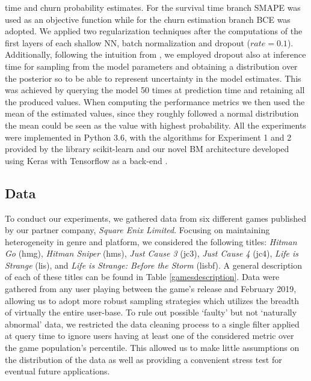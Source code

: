 time and churn probability estimates. For the survival time branch SMAPE was used as an objective function while for the churn estimation branch BCE was adopted. We applied two regularization techniques after the computations of the first layers of each shallow NN, batch normalization \cite{ioffe2015batch} and dropout \cite{srivastava2014dropout} ($rate = 0.1$). Additionally, following the intuition from \cite{gal2016dropout}, we employed dropout also at inference time for sampling from the model parameters and obtaining a distribution over the posterior so to be able to represent uncertainty in the model estimates. This was achieved by querying the model 50 times at prediction time and retaining all the produced values. When computing the performance metrics we then used the mean of the estimated values, since they roughly followed a normal distribution the mean could be seen as the value with highest probability. All the experiments were implemented in Python 3.6, with the algorithms for Experiment 1 and 2 provided by the library scikit-learn \cite{scikit-learn} and our novel BM architecture developed using Keras with Tensorflow as a back-end \cite{chollet2015keras}.

\subsection{Data}
To conduct our experiments, we gathered data from six different games published by our partner company, \textit{Square Enix Limited}. Focusing on maintaining heterogeneity in genre and platform, we considered the following titles: \emph{Hitman Go} (hmg), \emph{Hitman Sniper} (hms), \emph{Just Cause 3} (jc3), \emph{Just Cause 4} (jc4), \emph{Life is Strange} (lis), and \emph{Life is Strange: Before the Storm} (lisbf). A general description of each of these titles can be found in Table \ref{gamesdescription}. Data were gathered from any user playing between the game's release and February 2019, allowing us to adopt more robust sampling strategies which utilizes the breadth of virtually the entire user-base. To rule out possible `faulty' but not `naturally abnormal' data, we restricted the data cleaning process to a single filter applied at query time to ignore users having at least one of the considered metric over the game population's  percentile. This allowed us to make little assumptions on the distribution of the data as well as providing a convenient stress test for eventual future applications.



